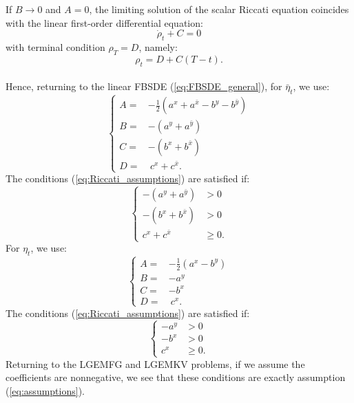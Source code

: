 \documentclass[11pt]{article}
\begin{document}
\begin{appendices}
	If $B \to 0$ and $A = 0$, the limiting solution of the scalar Riccati equation coincides with the linear first-order differential equation:
	\begin{equation*}
	    \dot{\rho}_t +C = 0
	\end{equation*}
	with terminal condition $\rho_T = D$, namely:
	\begin{equation*}
	    \rho_t = D + C(T-t).
	\end{equation*}\\
Hence, returning to the linear FBSDE (\ref{eq:FBSDE_general}), for $\bar{\eta}_t$, we use:
\begin{equation*}
	\left\{
	\begin{array}{rl}
		A=&-\frac{1}{2}(a^x+a^{\bar{x}}-b^y-b^{\bar{y}}) \\
		B=&-(a^y+a^{\bar{y}}) \\
		C=&-(b^x+b^{\bar{x}}) \\
		D=&\ c^x+c^{\bar{x}}.
	\end{array}
	\right.
\end{equation*}
The conditions (\ref{eq:Riccati_assumptions}) are satisfied if:
\begin{equation*}
	\left\{
	\begin{array}{rl}
		-(a^y+a^{\bar{y}})&>0 \\
		-(b^x+b^{\bar{x}})&>0 \\
		c^x+c^{\bar{x}}& \geq 0.
	\end{array}
	\right.
\end{equation*}
For $\eta_t$, we use:
\begin{equation*}
	\left\{
	\begin{array}{rl}
		A=&-\frac{1}{2}(a^x-b^y) \\
		B=&-a^y \\
		C=&-b^x \\
		D=&\ c^x.
	\end{array}
	\right.
\end{equation*}
The conditions (\ref{eq:Riccati_assumptions}) are satisfied if:
\begin{equation*}
	\left\{
	\begin{array}{rl}
		-a^y&>0 \\
		-b^x&>0 \\
		c^x& \geq0.
	\end{array}
	\right.
\end{equation*}
Returning to the LGEMFG and LGEMKV problems, if we assume the coefficients are nonnegative, we see that these conditions are exactly assumption (\ref{eq:assumptions}).

\end{appendices}
\end{document}
